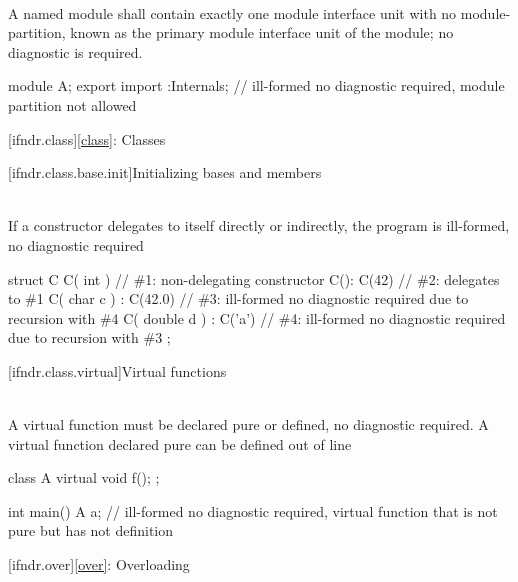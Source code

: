 \pnum
{} \\
A named module shall contain exactly one module interface
unit with no module-partition, known as the primary module interface unit of the module; no diagnostic is
required.

\pnum
\begin{example}
\begin{codeblock}
module A;
export import :Internals;       // ill-formed no diagnostic required, module partition not allowed
\end{codeblock}
\end{example}


[ifndr.class]{\ref{class}: Classes}

[ifndr.class.base.init]{Initializing bases and members}

\pnum
{} \\
If a constructor delegates to itself directly or indirectly,
the program is ill-formed, no diagnostic required

\pnum
\begin{example}
\begin{codeblock}
struct C {
  C( int ) { }                  // \#1: non-delegating constructor
  C(): C(42) { }                // \#2: delegates to \#1
  C( char c ) : C(42.0) { }     // \#3: ill-formed no diagnostic required due to recursion with \#4
  C( double d ) : C('a') { }    // \#4: ill-formed no diagnostic required due to recursion with \#3
};
\end{codeblock}
\end{example}


[ifndr.class.virtual]{Virtual functions}

\pnum
{} \\
A virtual function must be declared pure or defined, no diagnostic required. A virtual function declared pure can be defined
out of line

\pnum
\begin{example}
\begin{codeblock}
class A {
  virtual void f();
};

int main() {
  A a;      // ill-formed no diagnostic required, virtual function that is not pure but has not definition
}
\end{codeblock}
\end{example}


[ifndr.over]{\ref{over}: Overloading}

